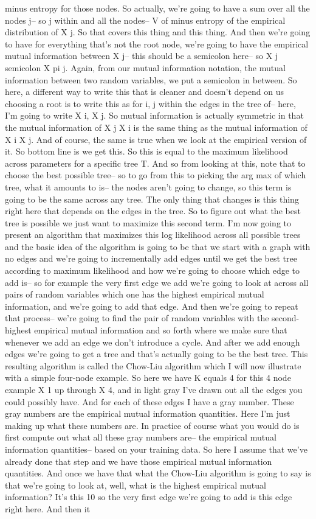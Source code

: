 minus entropy for those nodes. So actually, we're going to have a sum over all the nodes j-- so j within and all the nodes-- V of minus entropy of the empirical distribution of X j. So that covers this thing and this thing. And then we're going to have for everything that's not the root node, we're going to have the empirical mutual information between X j-- this should be a semicolon here-- so X j semicolon X pi j. Again, from our mutual information notation, the mutual information between two random variables, we put a semicolon in between. So here, a different way to write this that is cleaner and doesn't depend on us choosing a root is to write this as for i, j within the edges in the tree of-- here, I'm going to write X i, X j. So mutual information is actually symmetric in that the mutual information of X j X i is the same thing as the mutual information of X i X j. And of course, the same is true when we look at the empirical version of it. So bottom line is we get this. So this is equal to the maximum likelihood across parameters for a specific tree T. And so from looking at this, note that to choose the best possible tree-- so to go from this to picking the arg max of which tree, what it amounts to is-- the nodes aren't going to change, so this term is going to be the same across any tree. The only thing that changes is this thing right here that depends on the edges in the tree. So to figure out what the best tree is possible we just want to maximize this second term. I'm now going to present an algorithm that maximizes this log likelihood across all possible trees and the basic idea of the algorithm is going to be that we start with a graph with no edges and we're going to incrementally add edges until we get the best tree according to maximum likelihood and how we're going to choose which edge to add is-- so for example the very first edge we add we're going to look at across all pairs of random variables which one has the highest empirical mutual information, and we're going to add that edge. And then we're going to repeat that process-- we're going to find the pair of random variables with the second-highest empirical mutual information and so forth where we make sure that whenever we add an edge we don't introduce a cycle. And after we add enough edges we're going to get a tree and that's actually going to be the best tree. This resulting algorithm is called the Chow-Liu algorithm which I will now illustrate with a simple four-node example. So here we have K equals 4 for this 4 node example X 1 up through X 4, and in light gray I've drawn out all the edges you could possibly have. And for each of these edges I have a gray number. These gray numbers are the empirical mutual information quantities. Here I'm just making up what these numbers are. In practice of course what you would do is first compute out what all these gray numbers are-- the empirical mutual information quantities-- based on your training data. So here I assume that we've already done that step and we have those empirical mutual information quantities. And once we have that what the Chow-Liu algorithm is going to say is that we're going to look at, well, what is the highest empirical mutual information? It's this 10 so the very first edge we're going to add is this edge right here. And then it 